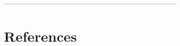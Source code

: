 \documentclass[preprint,10pt]{elsarticle}
\theoremstyle{definition}
\begin{document}



%

-----------------------------------------------------------------------------
\section{References}

\end{document}
